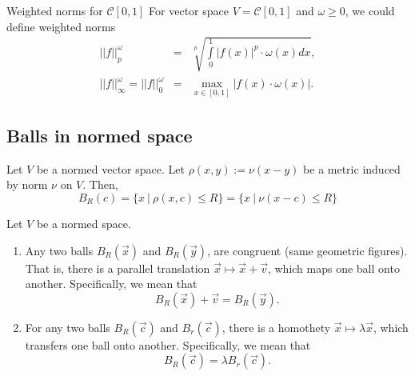\begin{definition}{Weighted norms for $ \mathcal{C}[0,1]$}{}
    For vector space $V = \mathcal{C}[0,1]$ and $\omega \geq 0$, we could define weighted norms
    \begin{eqnarray}
        \displaystyle ||f||_p^\omega &=& \sqrt[p]{\int\limits_0^1 |f(x)|^p \cdot \omega(x) dx}, \nonumber\\
        \displaystyle ||f||_\infty^\omega = ||f||_0^\omega &=& \max\limits_{x\in [0,1]} |f(x) \cdot \omega(x)|.\nonumber
    \end{eqnarray}
\end{definition}

\subsection*{Balls in normed space}
Let $V$ be a normed vector space. Let $\rho(x,y):=\nu(x-y)$ be a metric induced by norm $\nu$ on $V$. Then,
$$
    B_{R}(c)
    =
    \{x \ | \ \rho(x,c)\leq R \}
    =
    \{x \ | \ \nu(x-c)\leq R \}
$$
\begin{proposition}{}{}
    Let $V$ be a normed space.
    \begin{enumerate}
        \item Any two balls $B_R(\vec{x})$ and $B_R(\vec{y})$,  are congruent (same geometric figures). That is, there is a parallel translation $\vec{x} \mapsto \vec{x}+\vec{v}$, which maps one ball onto another. Specifically, we mean that 
        $$B_R(\vec{x})+\vec{v}=B_R(\vec{y}).$$
        
        \item For any two balls $B_R(\vec{c})$ and $B_r(\vec{c})$, there is a homothety $\vec{x} \mapsto \lambda \vec{x}$, which transfers one ball onto another. Specifically, we mean that 
        $$B_R(\vec{c}) = \lambda B_r(\vec{c}).$$
    \end{enumerate}
\end{proposition}
